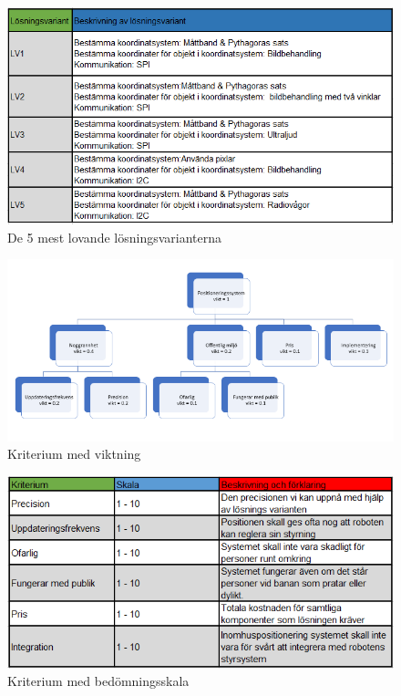 \documentclass[11pt, a4paper]{report}
\begin{document}
\begin{figure}[H]
	\begin{center}
		\includegraphics [width=12cm,angle=0]{5koncept.PNG}
		\caption{De 5 mest lovande lösningsvarianterna }
		\label{fig:5koncept}
	\end{center}
\end{figure}


\begin{figure}[H]
	\begin{center}
		\includegraphics [width=12cm,angle=0]{kriteriumvikt.PNG}
		\caption{Kriterium med viktning }
		\label{fig:kriteriumvikt}
	\end{center}
\end{figure}

\begin{figure}[H]
	\begin{center}
		\includegraphics [width=12cm,angle=0]{bedomningskala.PNG}
		\caption{Kriterium med bedömningsskala }
		\label{fig:bedomningskala}
	\end{center}
\end{figure}
\end{document}
